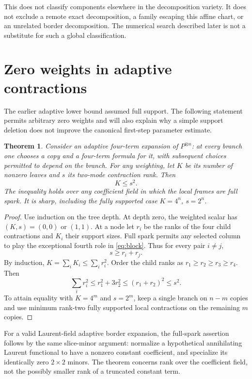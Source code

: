 \documentclass[11pt]{article}
\newtheorem{theorem}{Theorem}[section]
\theoremstyle{definition}\newtheorem{definition}[theorem]{Definition}
\begin{document}
This does not classify components elsewhere in the decomposition variety. It does not exclude a remote exact decomposition, a family escaping this affine chart, or an unrelated border decomposition. The numerical search described later is not a substitute for such a global classification.

\section{Zero weights in adaptive contractions}\label{sec:support}
The earlier adaptive lower bound assumed full support. The following statement permits arbitrary zero weights and will also explain why a simple support deletion does not improve the canonical first-step parameter estimate.

\begin{theorem}\label{thm:support}
Consider an adaptive four-term expansion of $P^{\otimes n}$: at every branch one chooses a copy and a four-term formula for it, with subsequent choices permitted to depend on the branch. For any weighting, let $K$ be its number of nonzero leaves and $s$ its two-mode contraction rank. Then
\begin{equation}\label{eq:support}
K\le s^2.
\end{equation}
The inequality holds over any coefficient field in which the local frames are full spark. It is sharp, including the fully supported case $K=4^n$, $s=2^n$.
\end{theorem}
\begin{proof}
Use induction on the tree depth. At depth zero, the weighted scalar has $(K,s)=(0,0)$ or $(1,1)$. At a node let $r_i$ be the ranks of the four child contractions and $K_i$ their support sizes. Full spark permits any selected column to play the exceptional fourth role in \eqref{eq:block}. Thus for every pair $i\ne j$,
\[
s\ge r_i+r_j.
\]
By induction, $K=\sum_iK_i\le\sum_ir_i^2$. Order the child ranks as $r_1\ge r_2\ge r_3\ge r_4$. Then
\[
\sum_ir_i^2\le r_1^2+3r_2^2
\le(r_1+r_2)^2\le s^2.
\]
To attain equality with $K=4^m$ and $s=2^m$, keep a single branch on $n-m$ copies and use minimum rank-two fully supported local contractions on the remaining $m$ copies.
\end{proof}
For a valid Laurent-field adaptive border expansion, the full-spark assertion follows by the same slice-minor argument: normalize a hypothetical annihilating Laurent functional to have a nonzero constant coefficient, and specialize its identically zero $2\times2$ minors. The theorem concerns rank over the coefficient field, not the possibly smaller rank of a truncated constant term.
\end{document}
